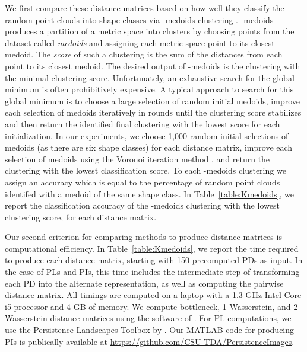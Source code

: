 \documentclass[11pt]{article}
\begin{document}
We first compare these distance matrices based on how well they classify the random point clouds into shape classes via -medoids clustering \citep{kaufman1987clustering,park2009simple}. -medoids produces a partition of a metric space into  clusters by choosing  points from the dataset called \emph{medoids} and assigning each metric space point to its closest medoid. The \emph{score} of such a clustering is the sum of the distances from each point to its closest medoid. The desired output of -medoids is the clustering with the minimal clustering score. Unfortunately, an exhaustive search for the global minimum is often prohibitively expensive. A typical approach to search for this global minimum is to choose a large selection of  random initial medoids, improve each selection of medoids iteratively in rounds until the clustering score stabilizes and then return the identified final clustering with the lowest score for each initialization. In our experiments, we choose 1,000 random initial selections of  medoids (as there are six shape classes) for each distance matrix, improve each selection of medoids using the Voronoi iteration method \citep{park2009simple}, and return the clustering with the lowest classification score. To each -medoids clustering we assign an accuracy which is equal to the percentage of random point clouds identifed with a medoid of the same shape class. In Table~\ref{table:Kmedoids}, we report the classification accuracy of the -medoids clustering with the lowest clustering score, for each distance matrix. 

Our second criterion for comparing methods to produce distance matrices is computational efficiency. In Table~\ref{table:Kmedoids}, we report the time required to produce each distance matrix, starting with 150 precomputed PDs as input. In the case of PLs and PIs, this time includes the intermediate step of transforming each PD into the alternate representation, as well as computing the pairwise distance matrix. All timings are computed on a laptop with a 1.3 GHz Intel Core i5 processor and 4 GB of memory. We compute bottleneck, 1-Wasserstein, and 2-Wasserstein distance matrices using the software of \citet{kerbergeometry}. For PL computations, we use the Persistence Landscapes Toolbox by \citet{bubenik2014persistence}. Our MATLAB code for producing PIs is publically available at \url{https://github.com/CSU-TDA/PersistenceImages}.
\end{document}
